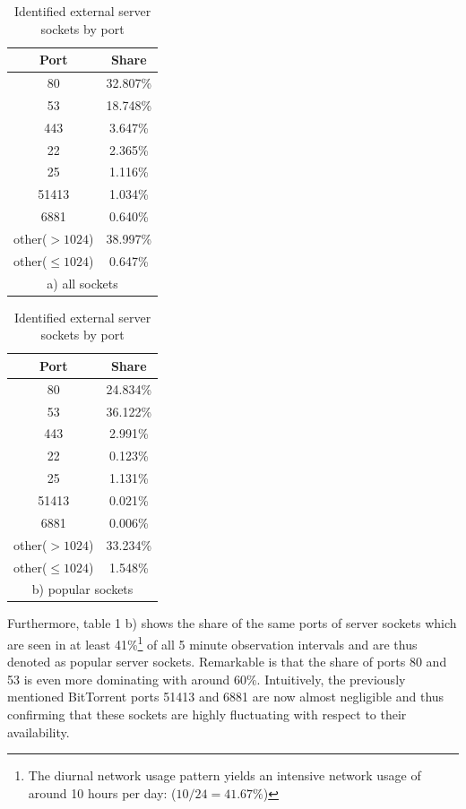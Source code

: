 \documentclass{sigcomm-alternate}
\begin{document}
\begin{table}[ht]
	\begin{minipage}[b]{0.45\linewidth}
	\centering
	\begin{tabular}{|c|c|}
	\hline
	Port & Share \\
	\hline \hline
	80 & 32.807\%  \\
	\hline
	53 & 18.748\%  \\
	\hline
	443 & 3.647\% \\
	\hline
	22  & 2.365\%\\
	\hline
	25 & 1.116\%\\
	\hline
	51413 & 1.034\%\\
	\hline
	6881 & 0.640\% \\
	\hline
	other($>1024$) & 38.997\% \\ 
	\hline
	other($\le1024$) & 0.647\%\\
	\hline
	\multicolumn{2}{c}{a) all sockets}
	\end{tabular}
	\end{minipage}
\hspace{0.25cm}
\begin{minipage}[b]{0.45\linewidth}
\centering
\begin{tabular}{|c|c|}
	\hline
	Port & Share \\
	\hline \hline
	80 & 24.834\%  \\
	\hline
	53 & 36.122\%  \\
	\hline
	443 & 2.991\% \\
	\hline
	22  & 0.123\%\\
	\hline
	25 & 1.131\%\\
	\hline
	51413 & 0.021\%\\
	\hline
	6881 & 0.006\% \\
	\hline
	other($>1024$) & 33.234\% \\ 
	\hline
	other($\le1024$) & 1.548\%\\
	\hline
	\multicolumn{2}{c}{b) popular sockets}
\end{tabular}
\end{minipage}
\label{tab:socketsport}
\caption{Identified external server sockets by port}
\end{table}

Furthermore, table 1 b) shows the share of the same ports of server sockets
which are seen in at least 41\%\footnote{The diurnal network usage pattern yields an intensive network usage of around 10 hours per day: ($10/24 = 41.67\%$) } of all 5 minute observation intervals and are thus
denoted as popular server sockets. Remarkable is that the share of ports 80 and 53
is even more dominating with around $60\%$. Intuitively, the previously mentioned
BitTorrent ports 51413 and 6881 are now almost negligible and thus confirming that
these sockets are highly fluctuating with respect to their availability.
\end{document}

